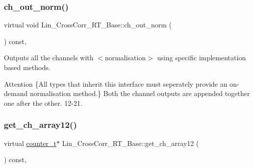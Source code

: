 \subsubsection{\texorpdfstring{ch\+\_\+out\+\_\+norm()}{ch\_out\_norm()}}
{\footnotesize\ttfamily virtual void Lin\+\_\+\+Cross\+Corr\+\_\+\+R\+T\+\_\+\+Base\+::ch\+\_\+out\+\_\+norm (\begin{DoxyParamCaption}{ }\end{DoxyParamCaption}) const\hspace{0.3cm}{\ttfamily [inline]}, {}}



Outputs all the channels with {\bfseries } $<$normalisation$>$ using specific implementation based methods. 

\begin{DoxyAttention}{Attention}
\{All types that inherit this interface must seperately provide an on-\/demand normalisation method.\} Both the channel outputs are appended together one after the other. 12-\/21. 
\end{DoxyAttention}
\mbox{\label{group__Lin__CorrCorr__Base__Out_gacc777900e8d232740373a70c1d5b4cce}} 
\subsubsection{\texorpdfstring{get\+\_\+ch\+\_\+array12()}{get\_ch\_array12()}}
{\footnotesize\ttfamily virtual \hyperlink{types_8hpp_ac89ac912f524b3e3fa3720ea55fec966}{counter\+\_\+t}$\ast$ Lin\+\_\+\+Cross\+Corr\+\_\+\+R\+T\+\_\+\+Base\+::get\+\_\+ch\+\_\+array12 (\begin{DoxyParamCaption}{ }\end{DoxyParamCaption}) const\hspace{0.3cm}{\ttfamily [inline]}, {}}

